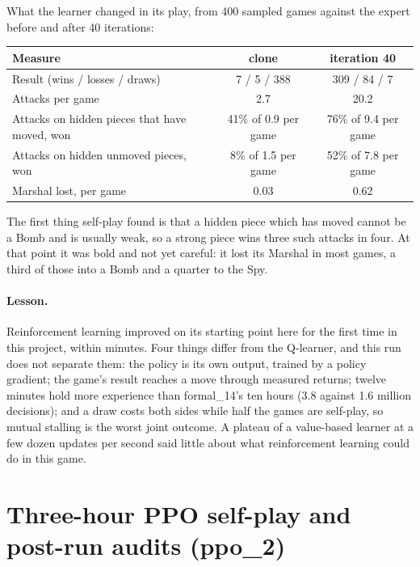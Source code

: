 What the learner changed in its play, from 400 sampled games against the expert before and after
40 iterations:
\begin{center}
\small
\begin{tabular}{lcc}
\toprule
Measure & clone & iteration 40 \\
\midrule
Result (wins / losses / draws) & 7 / 5 / 388 & 309 / 84 / 7 \\
Attacks per game & 2.7 & 20.2 \\
Attacks on hidden pieces that have moved, won & 41\% of 0.9 per game & 76\% of 9.4 per game \\
Attacks on hidden unmoved pieces, won & 8\% of 1.5 per game & 52\% of 7.8 per game \\
Marshal lost, per game & 0.03 & 0.62 \\
\bottomrule
\end{tabular}
\end{center}
The first thing self-play found is that a hidden piece which has moved cannot be a Bomb and is
usually weak, so a strong piece wins three such attacks in four. At that point it was bold and not
yet careful: it lost its Marshal in most games, a third of those into a Bomb and a quarter to the
Spy.

\paragraph{Lesson.} Reinforcement learning improved on its starting point here for the first
time in this project, within minutes. Four things differ from the Q-learner, and this run does not
separate them: the policy is its own output, trained by a policy gradient; the game's result
reaches a move through measured returns; twelve minutes hold more experience than formal\_14's ten
hours (3.8 against 1.6 million decisions); and a draw costs both sides while half the games are
self-play, so mutual stalling is the worst joint outcome. A plateau of a value-based learner at a
few dozen updates per second said little about what reinforcement learning could do in this game.

\section{Three-hour PPO self-play and post-run audits (ppo\_2)}
\label{sec:ppo2}

